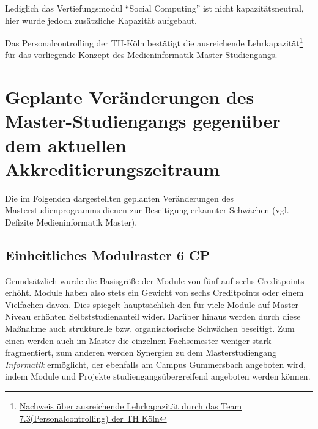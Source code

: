 Lediglich das Vertiefungsmodul ``Social Computing'' ist nicht
kapazitätsneutral, hier wurde jedoch zusätzliche Kapazität aufgebaut.

Das Personalcontrolling der TH-Köln bestätigt die ausreichende
Lehrkapazität\footnote{\href{https://th-koeln.github.io/mi-2017/anhaenge/th-verwaltung-kapa-nachweis.pdf}{Nachweis
  über ausreichende Lehrkapazität durch das Team
  7.3(Personalcontrolling) der TH Köln}} für das vorliegende Konzept des
Medieninformatik Master Studiengangs.

\section{Geplante Veränderungen des Master-Studiengangs gegenüber dem
aktuellen
Akkreditierungszeitraum\label{/mi-2017/selbstbericht/0150-soll-zustand-geplante-veraenderungen/0000-geplante-veraenderungen-bachelor}}\label{geplante-veruxe4nderungen-des-master-studiengangs-gegenuxfcber-dem-aktuellen-akkreditierungszeitraumpathlabelmi-2017selbstbericht0150-soll-zustand-geplante-veraenderungen0000-geplante-veraenderungen-bachelor}

Die im Folgenden dargestellten geplanten Veränderungen des
Masterstudienprogramms dienen zur Beseitigung erkannter Schwächen (vgl.
Defizite Medieninformatik Master).

\subsection{Einheitliches Modulraster 6
CP\label{/mi-2017/selbstbericht/0150-soll-zustand-geplante-veraenderungen/0000-geplante-veraenderungen-bachelor}}\label{einheitliches-modulraster-6-cppathlabelmi-2017selbstbericht0150-soll-zustand-geplante-veraenderungen0000-geplante-veraenderungen-bachelor}

Grundsätzlich wurde die Basisgröße der Module von fünf auf sechs
Creditpoints erhöht. Module haben also stets ein Gewicht von sechs
Creditpoints oder einem Vielfachen davon. Dies spiegelt hauptsächlich
den für viele Module auf Master-Niveau erhöhten Selbststudienanteil
wider. Darüber hinaus werden durch diese Maßnahme auch strukturelle bzw.
organisatorische Schwächen beseitigt. Zum einen werden auch im Master
die einzelnen Fachsemester weniger stark fragmentiert, zum anderen
werden Synergien zu dem Masterstudiengang \emph{Informatik} ermöglicht,
der ebenfalls am Campus Gummersbach angeboten wird, indem Module und
Projekte studiengangsübergreifend angeboten werden können.

